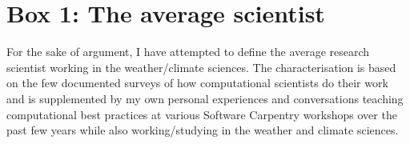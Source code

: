 \section*{Box 1: The average scientist}

For the sake of argument, I have attempted to define the average research scientist working in the weather/climate sciences. The characterisation is based on the few documented surveys of how computational scientists do their work \citep{Hannay2009,Stodden2010} and is supplemented by my own personal experiences and conversations teaching computational best practices at various Software Carpentry workshops over the past few years while also working/studying in the weather and climate sciences. 




